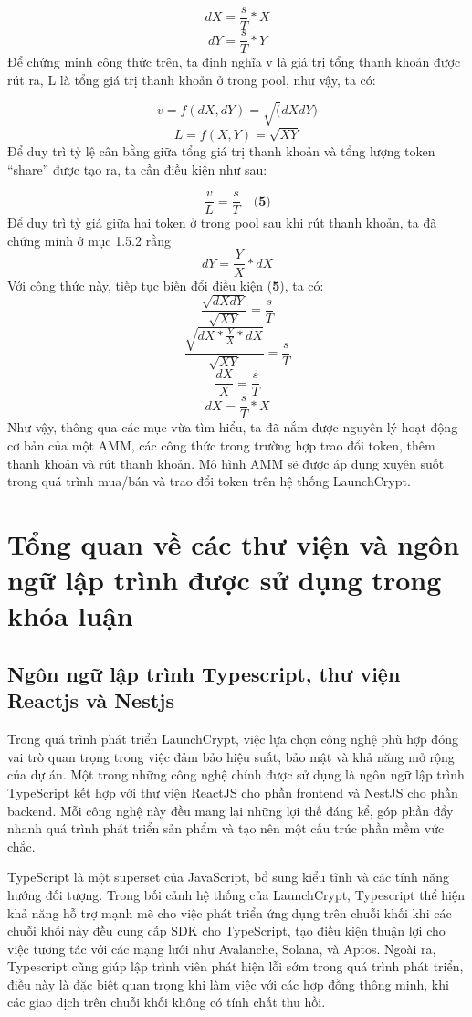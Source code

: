 \[dX = \frac{s}{T} * X\]
\[dY = \frac{s}{T} * Y\]
Để chứng minh công thức trên, ta định nghĩa v là giá trị tổng thanh khoản được
rút ra, L là tổng giá trị thanh khoản ở trong pool, như vậy, ta có:

\[v = f(dX,dY) = \sqrt(dXdY)\]
\[L = f(X,Y) = \sqrt{XY}\]
Để duy trì tỷ lệ cân bằng giữa tổng giá trị thanh khoản và tổng lượng token
“share” được tạo ra, ta cần điều kiện như sau:

\[\frac{v}{L} = \frac{s}{T} \quad \textbf{(5)}\]
Để duy trì tỷ giá giữa hai token ở trong pool sau khi rút thanh khoản, ta đã
chứng minh ở mục 1.5.2 rằng  \[dY = \frac{Y}{X} * dX\]
Với công thức này, tiếp tục biến đổi điều kiện (\textbf{5}), ta có:
\[\frac{\sqrt{dXdY}}{\sqrt{XY}} = \frac{s}{T}\]
\[\frac{\sqrt{dX * \frac{Y}{X} * dX}}{\sqrt{XY}} = \frac{s}{T}\]
\[\frac{dX}{X} = \frac{s}{T}\]
\[dX = \frac{s}{T} * X \]
Như vậy, thông qua các mục vừa tìm hiểu, ta đã nắm được nguyên lý hoạt động cơ
bản của một AMM, các công thức trong trường hợp trao đổi token, thêm thanh
khoản và rút thanh khoản. Mô hình AMM sẽ được áp dụng xuyên suốt trong quá
trình mua/bán và trao đổi token trên hệ thống LaunchCrypt.

\section{Tổng quan về các thư viện và ngôn ngữ lập trình được sử dụng trong
  khóa luận}
\subsection{Ngôn ngữ lập trình Typescript, thư viện Reactjs và Nestjs}
\hspace{1cm}Trong quá trình phát triển LaunchCrypt, việc lựa chọn công nghệ phù
hợp đóng vai trò quan trọng trong việc đảm bảo hiệu suất, bảo mật và khả năng
mở rộng của dự án. Một trong những công nghệ chính được sử dụng là ngôn ngữ lập
trình TypeScript kết hợp với thư viện ReactJS cho phần frontend và NestJS cho
phần backend. Mỗi công nghệ này đều mang lại những lợi thế đáng kể, góp phần
đẩy nhanh quá trình phát triển sản phẩm và tạo nên một cấu trúc phần mềm vức
chắc.

TypeScript là một superset của JavaScript, bổ sung kiểu tĩnh và các tính năng
hướng đối tượng. Trong bối cảnh hệ thống của LaunchCrypt, Typescript thể hiện
khả năng hỗ trợ mạnh mẽ cho việc phát triển ứng dụng trên chuỗi khối khi các
chuỗi khối này
đều cung cấp SDK cho TypeScript, tạo điều kiện thuận lợi cho việc tương tác với
các mạng lưới như Avalanche, Solana, và Aptos. Ngoài ra, Typescript cũng giúp
lập trình viên phát hiện lỗi sớm trong quá trình phát triển, điều này là đặc
biệt quan trọng khi làm việc với các hợp đồng thông minh, khi các giao dịch
trên
chuỗi khối không có tính chất thu hồi.

